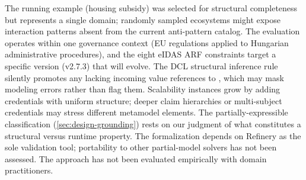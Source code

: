 The running example (housing subsidy) was selected for structural completeness but represents a single domain; randomly sampled ecosystems might expose interaction patterns absent from the current anti-pattern catalog. The evaluation operates within one governance context (EU regulations applied to Hungarian administrative procedures), and the eight eIDAS \ac{ARF} constraints target a specific version (v2.7.3) that will evolve. The \ac{DCL} structural inference rule silently promotes any  lacking incoming value references to , which may mask modeling errors rather than flag them. Scalability instances grow by adding credentials with uniform structure; deeper claim hierarchies or multi-subject credentials may stress different metamodel elements. The partially-expressible classification (\autoref{sec:design-grounding}) rests on our judgment of what constitutes a structural versus runtime property. The formalization depends on Refinery as the sole validation tool; portability to other partial-model solvers has not been assessed. The approach has not been evaluated empirically with domain practitioners.
